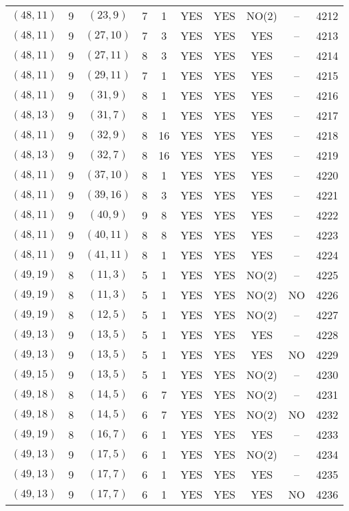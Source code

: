 \begin{longtable}{|c|c|c|c|c|c|c|c|c|c|}
$(48, 11)$ & 9 & $(23, 9)$ & 7 & 1 & YES & YES & NO(2) & -- & 4212\\
$(48, 11)$ & 9 & $(27, 10)$ & 7 & 3 & YES & YES & YES & -- & 4213\\
$(48, 11)$ & 9 & $(27, 11)$ & 8 & 3 & YES & YES & YES & -- & 4214\\
$(48, 11)$ & 9 & $(29, 11)$ & 7 & 1 & YES & YES & YES & -- & 4215\\
$(48, 11)$ & 9 & $(31, 9)$ & 8 & 1 & YES & YES & YES & -- & 4216\\
$(48, 13)$ & 9 & $(31, 7)$ & 8 & 1 & YES & YES & YES & -- & 4217\\
$(48, 11)$ & 9 & $(32, 9)$ & 8 & 16 & YES & YES & YES & -- & 4218\\
$(48, 13)$ & 9 & $(32, 7)$ & 8 & 16 & YES & YES & YES & -- & 4219\\
$(48, 11)$ & 9 & $(37, 10)$ & 8 & 1 & YES & YES & YES & -- & 4220\\
$(48, 11)$ & 9 & $(39, 16)$ & 8 & 3 & YES & YES & YES & -- & 4221\\
$(48, 11)$ & 9 & $(40, 9)$ & 9 & 8 & YES & YES & YES & -- & 4222\\
$(48, 11)$ & 9 & $(40, 11)$ & 8 & 8 & YES & YES & YES & -- & 4223\\
$(48, 11)$ & 9 & $(41, 11)$ & 8 & 1 & YES & YES & YES & -- & 4224\\
$(49, 19)$ & 8 & $(11, 3)$ & 5 & 1 & YES & YES & NO(2) & -- & 4225\\
$(49, 19)$ & 8 & $(11, 3)$ & 5 & 1 & YES & YES & NO(2) & NO & 4226\\
$(49, 19)$ & 8 & $(12, 5)$ & 5 & 1 & YES & YES & NO(2) & -- & 4227\\
$(49, 13)$ & 9 & $(13, 5)$ & 5 & 1 & YES & YES & YES & -- & 4228\\
$(49, 13)$ & 9 & $(13, 5)$ & 5 & 1 & YES & YES & YES & NO & 4229\\
$(49, 15)$ & 9 & $(13, 5)$ & 5 & 1 & YES & YES & NO(2) & -- & 4230\\
$(49, 18)$ & 8 & $(14, 5)$ & 6 & 7 & YES & YES & NO(2) & -- & 4231\\
$(49, 18)$ & 8 & $(14, 5)$ & 6 & 7 & YES & YES & NO(2) & NO & 4232\\
$(49, 19)$ & 8 & $(16, 7)$ & 6 & 1 & YES & YES & YES & -- & 4233\\
$(49, 13)$ & 9 & $(17, 5)$ & 6 & 1 & YES & YES & NO(2) & -- & 4234\\
$(49, 13)$ & 9 & $(17, 7)$ & 6 & 1 & YES & YES & YES & -- & 4235\\
$(49, 13)$ & 9 & $(17, 7)$ & 6 & 1 & YES & YES & YES & NO & 4236\\

\end{longtable}
